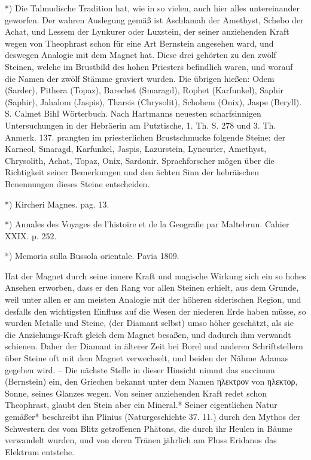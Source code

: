 \documentclass[a4paper, 11pt, oneside, polutonikogreek, german]{article}
\begin{document}
*) Die Talmudische Tradition hat, wie in so vielen, auch hier alles untereinander geworfen. Der wahren Auslegung gemäß ist Aschlamah der Amethyst, Schebo der Achat, und Lessem der Lynkurer oder Luxstein, der seiner anziehenden Kraft wegen von Theophrast schon für eine Art Bernstein angesehen ward, und deswegen Analogie mit dem Magnet hat. Diese drei gehörten zu den zwölf Steinen, welche im Brustbild des hohen Priesters befindlich waren, und worauf die Namen der zwölf Stämme graviert wurden. Die übrigen hießen: Odem (Sarder), Pithera (Topaz), Barechet (Smaragd), Rophet (Karfunkel), Saphir (Saphir), Jahalom (Jaspis), Tharsis (Chrysolit), Schohem (Onix), Jaspe (Beryll). S. Calmet Bihl Wörterbuch. Nach Hartmanns neuesten scharfsinnigen Untersuchungen in der Hebräerin am Putztische, 1. Th. S. 278 und 3. Th. Anmerk. 137. prangten im priesterlichen Brustschmucke folgende Steine: der Karneol, Smaragd, Karfunkel, Jaspis, Lazurstein, Lyncurier, Amethyst, Chrysolith, Achat, Topaz, Onix, Sardonir. Sprachforscher mögen über die Richtigkeit seiner Bemerkungen und den ächten Sinn der hebräischen Benennungen dieses Steine entscheiden.

*) Kircheri Magnes. pag. 13.

*) Annales des Voyages de l'histoire et de la Geografie par Maltebrun. Cahier XXIX. p. 252.

*) Memoria sulla Bussola orientale. Pavia 1809.

Hat der Magnet durch seine innere Kraft und magische Wirkung sich ein so hohes Ansehen erworben, dass er den Rang vor allen Steinen erhielt, aus dem Grunde, weil unter allen er am meisten Analogie mit der höheren siderischen Region, und desfalls den wichtigsten Einfluss auf die Wesen der niederen Erde haben müsse, so wurden Metalle und Steine, (der Diamant selbst) umso höher geschätzt, als sie die Anziehungs-Kraft gleich dem Magnet besaßen, und dadurch ihm verwandt schienen. Daher der Diamant in älterer Zeit bei Borel und anderen Schriftstellern über Steine oft mit dem Magnet verwechselt, und beiden der Nähme Adamas gegeben wird. -- Die nächste Stelle in dieser Hinsicht nimmt das succinum (Bernstein) ein, den Griechen bekannt unter dem Namen ηλεκτρον von ηλεκτορ, Sonne, seines Glanzes wegen. Von seiner anziehenden Kraft redet schon Theophrast, glaubt den Stein aber ein Mineral.* Seiner eigentlichen Natur gemäßer* beschreibt ihn Plinius (Naturgeschichte 37. 11.) durch den Mythos der Schwestern des vom Blitz getroffenen Phätons, die durch ihr Heulen in Bäume verwandelt wurden, und von deren Tränen jährlich am Fluss Eridanos das Elektrum entstehe.
\end{document}
